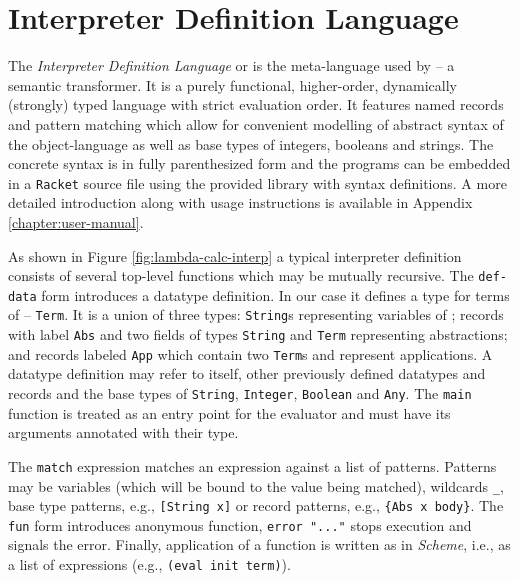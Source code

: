 \section{Interpreter Definition Language}\label{sec:idl}
The \emph{Interpreter Definition Language} or \IDL{} is the meta-language used by \semt{} -- a semantic transformer.
It is a purely functional, higher-order, dynamically (strongly) typed language with strict evaluation order.
It features named records and pattern matching which allow for convenient modelling of abstract syntax of the object-language as well as base types of integers, booleans and strings.
The concrete syntax is in fully parenthesized form and the programs can be embedded in a \texttt{Racket} source file using the provided library with syntax definitions.
A more detailed introduction along with usage instructions is available in 
Appendix \ref{chapter:user-manual}.

As shown in Figure \ref{fig:lambda-calc-interp} a typical interpreter definition consists of several top-level functions which may be mutually recursive.
The \lstinline!def-data! form introduces a datatype definition.
In our case it defines a type for terms of \LC{} -- \lstinline!Term!.
It is a union of three types: \lstinline!String!s representing variables of \LC{}; records with label \lstinline!Abs! and two fields of types \lstinline!String! and \lstinline!Term! representing abstractions; and records labeled \lstinline!App! which contain two \lstinline!Term!s and represent applications.
A datatype definition may refer to itself, other previously defined datatypes and records and the base types of \lstinline!String!, \lstinline!Integer!, \lstinline!Boolean! and \lstinline!Any!.
The \texttt{main} function is treated as an entry point for the evaluator and must have its arguments annotated with their type.

The \lstinline!match! expression matches an expression against a list of patterns.
Patterns may be variables (which will be bound to the value being matched), wildcards \lstinline!_!, base type patterns, e.g., \lstinline![String x]! or record patterns, e.g., \lstinline!{Abs x body}!.
The \lstinline!fun! form introduces anonymous function, \lstinline!error "..."! stops execution and signals the error.
Finally, application of a function is written as in \textit{Scheme}, i.e., as a list of expressions (e.g., \lstinline!(eval init term)!).

